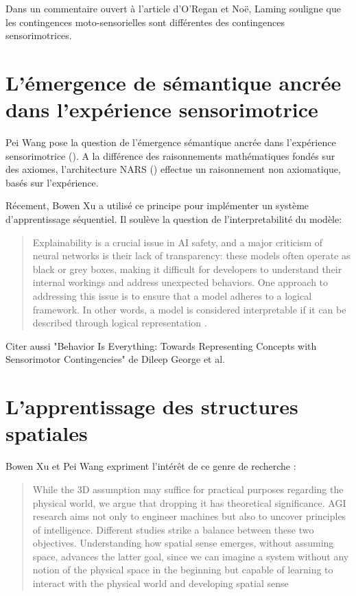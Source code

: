 Dans un commentaire ouvert à l'article d'O'Regan et Noë, Laming \cite{laming_distinction_2001} souligne que les contingences \og moto-sensorielles \fg sont différentes des contingences sensorimotrices. 

\section{L'émergence de sémantique ancrée dans l'expérience sensorimotrice}

Pei Wang \cite{wang_experience-grounded_2005} pose la question de l'émergence sémantique ancrée dans l'expérience sensorimotrice ().
A la différence des raisonnements mathématiques fondés sur des axiomes, l'architecture NARS () effectue un raisonnement non axiomatique, basés sur l'expérience.

Récement, Bowen Xu \cite{xu_brain-inspired_2025} a utilisé ce principe pour implémenter un système d'apprentissage séquentiel. 
Il soulève la question de l'interpretabilité du modèle: 
\begin{quote}
	Explainability is a crucial issue in AI safety, and a major criticism of neural networks is their lack of transparency: these models often operate as black or grey boxes, making it difficult for developers to understand their internal workings and address unexpected behaviors. One approach to addressing this issue is to ensure that a model adheres to a logical framework. In other words, a model is considered interpretable if it can be described through logical representation \cite[p.~1]{xu_brain-inspired_2025}.
\end{quote}


Citer aussi "Behavior Is Everything: Towards Representing Concepts with Sensorimotor Contingencies" de Dileep George et al.



\section{L'apprentissage des structures spatiales}

Bowen Xu et Pei Wang \cite{xu_essence_2025} expriment l'intérêt de ce genre de recherche : 
\begin{quote}
	While the 3D assumption may suffice for practical purposes regarding the physical world, we argue that dropping it has theoretical significance. 
	AGI research aims not only to engineer machines but also to uncover principles of intelligence. 
	Different studies strike a balance between these two objectives. 
	Understanding how spatial sense emerges, without assuming space, advances the latter goal, since we can imagine a system without any notion of the physical space in the beginning but capable of learning to interact with the physical world and developing spatial sense \cite[p.~2]{xu_essence_2025}
\end{quote}

